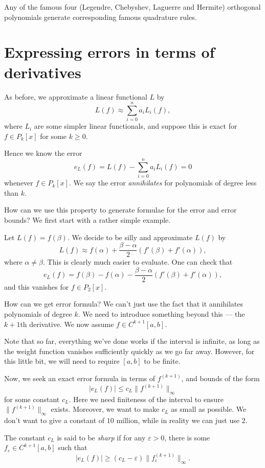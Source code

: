 \documentclass[a4paper]{article}
\begin{document}
\begin{eg}
  Any of the famous four (Legendre, Chebyshev, Laguerre and Hermite) orthogonal polynomials generate corresponding famous quadrature rules.
\end{eg}

\section{Expressing errors in terms of derivatives}
As before, we approximate a linear functional $L$ by
\[
  L(f) \approx \sum_{i = 0}^n a_i L_i(f),
\]
where $L_i$ are some simpler linear functionals, and suppose this is exact for $f \in P_k[x]$ for some $k \geq 0$.

Hence we know the error
\[
  e_L(f) = L(f) - \sum_{i = 0}^n a_i L_i(f) = 0
\]
whenever $f \in P_k[x]$. We say the error \emph{annihilates} for polynomials of degree less than $k$.

How can we use this property to generate formulae for the error and error bounds? We first start with a rather simple example.
\begin{eg}
  Let $L(f) = f(\beta)$. We decide to be silly and approximate $L(f)$ by
  \[
    L(f) \approx f(\alpha) + \frac{\beta - \alpha}{2} (f'(\beta) + f'(\alpha)),
  \]
  where $\alpha \not= \beta$. This is clearly much easier to evaluate. One can check that
  \[
    e_L(f) = f(\beta) - f(\alpha) - \frac{\beta - \alpha}{2} (f'(\beta) + f'(\alpha)),
  \]
  and this vanishes for $f \in P_2[x]$.
\end{eg}
How can we get error formula? We can't just use the fact that it annihilates polynomials of degree $k$. We need to introduce something beyond this --- the $k + 1$th derivative. We now assume $f \in C^{k + 1}[a, b]$.

Note that so far, everything we've done works if the interval is infinite, as long as the weight function vanishes sufficiently quickly as we go far away. However, for this little bit, we will need to require $[a, b]$ to be finite.

Now, we seek an exact error formula in terms of $f^{(k + 1)}$, and bounds of the form
\[
  |e_L(f)| \leq c_L \|f^{(k + 1)}\|_{\infty}
\]
for some constant $c_L$. Here we need finiteness of the interval to ensure $\|f^{(k + 1)}\|_{\infty}$ exists. Moreover, we want to make $c_L$ as small as possible. We don't want to give a constant of $10$ million, while in reality we can just use $2$.

\begin{defi}
  The constant $c_L$ is said to be \emph{sharp} if for any $\varepsilon > 0$, there is some $f_{\varepsilon} \in C^{k + 1}[a, b]$ such that
  \[
    |e_L(f)| \geq (c_L - \varepsilon)\|f^{(k + 1)}_\varepsilon\|_{\infty}.
  \]
\end{defi}
\end{document}
